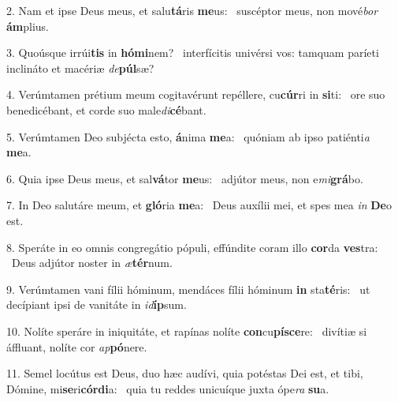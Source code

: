2. Nam et ipse Deus meus, et salu\textbf{tá}ris \textbf{me}us: \ast\  suscéptor meus, non mové\textit{bor} \textbf{ám}plius.\

3. Quoúsque irrúi\textbf{tis} in \textbf{hó}\textbf{mi}nem? \ast\  interfícitis univérsi vos: tamquam paríeti inclináto et macériæ \textit{de}\textbf{púl}sæ?\

4. Verúmtamen prétium meum cogitavérunt repéllere, cu\textbf{cúr}ri in \textbf{si}ti: \ast\  ore suo benedicébant, et corde suo male\textit{di}\textbf{cé}bant.\

5. Verúmtamen Deo subjécta esto, \textbf{á}nima \textbf{me}a: \ast\  quóniam ab ipso patiénti\textit{a} \textbf{me}a.\

6. Quia ipse Deus meus, et sal\textbf{vá}tor \textbf{me}us: \ast\  adjútor meus, non e\textit{mi}\textbf{grá}bo.\

7. In Deo salutáre meum, et \textbf{gló}ria \textbf{me}a: \ast\  Deus auxílii mei, et spes mea \textit{in} \textbf{De}o est.\

8. Speráte in eo omnis congregátio pópuli, effúndite coram illo \textbf{cor}da \textbf{ves}tra: \ast\  Deus adjútor noster in \textit{æ}\textbf{tér}num.\

9. Verúmtamen vani fílii hóminum, mendáces fílii hóminum \textbf{in} sta\textbf{té}ris: \ast\  ut decípiant ipsi de vanitáte in \textit{id}\textbf{íp}sum.\

10. Nolíte speráre in iniquitáte, et rapínas nolíte \textbf{con}cu\textbf{pí}\textbf{sce}re: \ast\  divítiæ si áffluant, nolíte cor \textit{ap}\textbf{pó}nere.\

11. Semel locútus est Deus, duo hæc audívi, quia potéstas Dei est, et tibi, Dómine, mi\textbf{se}ri\textbf{cór}\textbf{di}a: \ast\  quia tu reddes unicuíque juxta ópe\textit{ra} \textbf{su}a.\

